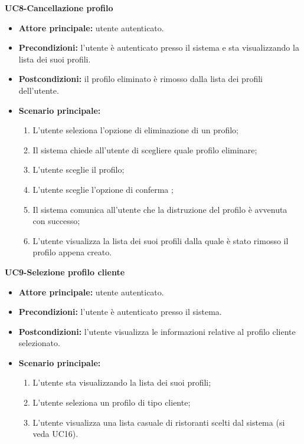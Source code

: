 \textbf{UC8-Cancellazione profilo}
\begin{itemize}
\item \textbf{Attore principale:} utente autenticato.
\item \textbf{Precondizioni:} l'utente è autenticato presso il sistema e sta visualizzando la lista dei suoi profili.
\item \textbf{Postcondizioni:} il profilo eliminato è rimosso dalla lista dei profili dell'utente.
\item \textbf{Scenario principale:}
\begin{enumerate}
    \item L'utente seleziona l'opzione di eliminazione di un profilo;
    \item Il sistema chiede all'utente di scegliere quale profilo eliminare;
    \item L'utente sceglie il profilo;
    \item L'utente sceglie l'opzione di conferma ;
    \item Il sistema comunica all'utente che la distruzione del profilo è avvenuta con successo;
    \item L'utente visualizza la lista dei suoi profili dalla quale è stato rimosso il profilo appena creato.
\end{enumerate}
\end{itemize}

\textbf{UC9-Selezione profilo cliente}
\begin{itemize}
\item \textbf{Attore principale:} utente autenticato.
\item \textbf{Precondizioni:} l'utente è autenticato presso il sistema.
\item \textbf{Postcondizioni:} l'utente visualizza le informazioni relative al profilo cliente selezionato.
\item \textbf{Scenario principale:}
\begin{enumerate}
    \item L'utente sta visualizzando la lista dei suoi profili;
    \item L'utente seleziona un profilo di tipo cliente;
    \item L'utente visualizza una lista casuale di ristoranti scelti dal sistema (si veda UC16).
\end{enumerate}
\end{itemize}

